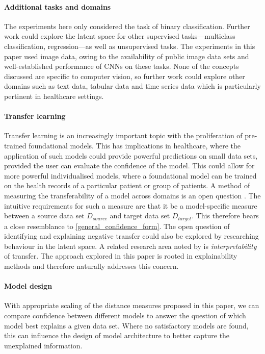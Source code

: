 \documentclass{article}
\begin{document}
\paragraph{Additional tasks and domains}
The experiments here only considered the task of binary classification. Further work could explore the latent space for other supervised tasks---multiclass classification, regression---as well as unsupervised tasks.
The experiments in this paper used image data, owing to the availability of public image data sets and well-established performance of CNNs on these tasks. None of the concepts discussed are specific to computer vision, so further work could explore other domains such as text data, tabular data and time series data which is particularly pertinent in healthcare settings.

\paragraph{Transfer learning} \label{sec:transfer learning}
Transfer learning is an increasingly important topic with the proliferation of pre-trained foundational models.
This has implications in healthcare, where the application of such models could provide powerful predictions on small data sets, provided the user can evaluate the confidence of the model. This could allow for more powerful individualised models, where a foundational model can be trained on the health records of a particular patient or group of patients.
A method of measuring the transferability of a model across domains is an open question \cite{pan_survey_2010} \cite{zhuang_comprehensive_2021}. The intuitive requirements for such a measure are that it be a model-specific measure between  a source data set $D_{source}$ and target data set $D_{target}$. This therefore bears a close resemblance to \ref{general_confidence_form}.
The open question of identifying and explaining negative transfer could also be explored by researching behaviour in the latent space.
A related research area noted by \cite{zhuang_comprehensive_2021} is \emph{interpretability} of transfer. The approach explored in this paper is rooted in explainability methods and therefore naturally addresses this concern.

\paragraph{Model design}
With appropriate scaling of the distance measures proposed in this paper, we can compare confidence between different models to answer the question of which model best explains a given data set. Where no satisfactory models are found, this can influence the design of model architecture to better capture the unexplained information.
\end{document}
